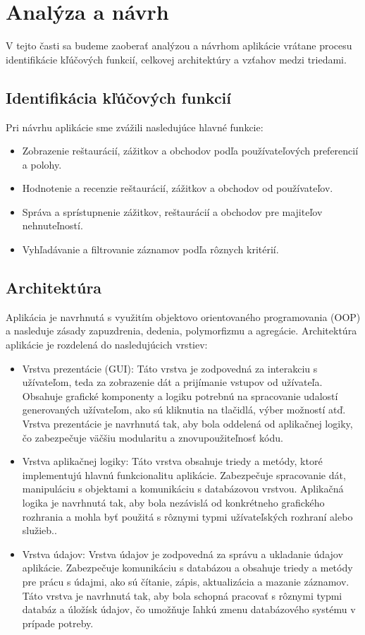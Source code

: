 \documentclass{article}
\begin{document}
\section{Analýza a návrh}
V tejto časti sa budeme zaoberať analýzou a návrhom aplikácie vrátane procesu identifikácie kľúčových funkcií, celkovej architektúry a vzťahov medzi triedami.

\subsection{Identifikácia kľúčových funkcií}
Pri návrhu aplikácie sme zvážili nasledujúce hlavné funkcie:

\begin{itemize}
\item Zobrazenie reštaurácií, zážitkov a obchodov podľa používateľových preferencií a polohy.
\item Hodnotenie a recenzie reštaurácií, zážitkov a obchodov od používateľov.
\item Správa a sprístupnenie zážitkov, reštaurácií a obchodov pre majiteľov nehnuteľností.
\item Vyhľadávanie a filtrovanie záznamov podľa rôznych kritérií.
\end{itemize}


\subsection{Architektúra}
Aplikácia je navrhnutá s využitím objektovo orientovaného programovania (OOP) a nasleduje zásady zapuzdrenia, dedenia, polymorfizmu a agregácie. Architektúra aplikácie je rozdelená do nasledujúcich vrstiev:


\begin{itemize}
\item Vrstva prezentácie (GUI): Táto vrstva je zodpovedná za interakciu s užívateľom, teda za zobrazenie dát a prijímanie vstupov od užívateľa. Obsahuje grafické komponenty a logiku potrebnú na spracovanie udalostí generovaných užívateľom, ako sú kliknutia na tlačidlá, výber možností atď. Vrstva prezentácie je navrhnutá tak, aby bola oddelená od aplikačnej logiky, čo zabezpečuje väčšiu modularitu a znovupoužiteľnosť kódu.
\item Vrstva aplikačnej logiky: Táto vrstva obsahuje triedy a metódy, ktoré implementujú hlavnú funkcionalitu aplikácie. Zabezpečuje spracovanie dát, manipuláciu s objektami a komunikáciu s databázovou vrstvou. Aplikačná logika je navrhnutá tak, aby bola nezávislá od konkrétneho grafického rozhrania a mohla byť použitá s rôznymi typmi užívateľských rozhraní alebo služieb..
\item Vrstva údajov: Vrstva údajov je zodpovedná za správu a ukladanie údajov aplikácie. Zabezpečuje komunikáciu s databázou a obsahuje triedy a metódy pre prácu s údajmi, ako sú čítanie, zápis, aktualizácia a mazanie záznamov. Táto vrstva je navrhnutá tak, aby bola schopná pracovať s rôznymi typmi databáz a úložísk údajov, čo umožňuje ľahkú zmenu databázového systému v prípade potreby.
\end{itemize}
\end{document}

